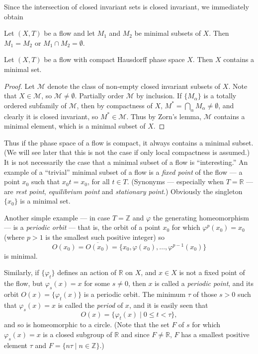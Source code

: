 Since the intersection of closed invariant sets is closed invariant, we immediately obtain


\begin{proposition}
    Let $(X,T)$ be a flow and let $M_1$ and $M_2$ be minimal subsets of $X$. Then $M_1 = M_2$ or $M_1 \cap M_2 = \emptyset$.
\end{proposition}


\begin{theorem}
    Let $(X,T)$ be a flow with compact Hausdorff phase space $X$. Then $X$ contains a minimal set.
\end{theorem}

\begin{proof}
    Let $\mathcal{M}$ denote the class of non-empty closed invariant subsets of $X$. Note that $X \in \mathcal{M}$, so $\mathcal{M} \ne \emptyset$. Partially order $\mathcal{M}$ by inclusion. If $\{M_\alpha\}$ is a totally ordered subfamily of $\mathcal{M}$, then by compactness of $X$, $M^* = \bigcap_\alpha M_\alpha \ne \emptyset$, and clearly it is closed invariant, so $M^* \in \mathcal{M}$. Thus by Zorn’s lemma, $\mathcal{M}$ contains a minimal element, which is a minimal subset of $X$.
\end{proof}


Thus if the phase space of a flow is compact, it always contains a minimal subset. (We will see later that this is not the case if only local compactness is assumed.) It is not necessarily the case that a minimal subset of a flow is “interesting.” An example of a “trivial” minimal subset of a flow is a \emph{fixed point} of the flow — a point $x_0$ such that $x_0 t = x_0$, for all $t \in T$. (Synonyms — especially when $T = \mathbb{R}$ — are \emph{rest point}, \emph{equilibrium point} and \emph{stationary point}.) Obviously the singleton $\{x_0\}$ is a minimal set.

Another simple example — in case $T = \mathbb{Z}$ and $\varphi$ the generating homeomorphism — is a \emph{periodic orbit} — that is, the orbit of a point $x_0$ for which $\varphi^p(x_0) = x_0$ (where $p > 1$ is the smallest such positive integer) so
\[
    O(x_0) = \overline{O(x_0)} = \{x_0, \varphi(x_0), \ldots, \varphi^{p-1}(x_0)\}
\]
is minimal.

Similarly, if $\{\varphi_t\}$ defines an action of $\mathbb{R}$ on $X$, and $x \in X$ is not a fixed point of the flow, but $\varphi_s(x) = x$ for some $s \neq 0$, then $x$ is called a \emph{periodic point}, and its orbit $O(x) = \{\varphi_t(x)\}$ is a periodic orbit. The minimum $\tau$ of those $s > 0$ such that $\varphi_s(x) = x$ is called the \emph{period} of $x$, and it is easily seen that
\[
    O(x) = \{\varphi_t(x) \mid 0 \le t < \tau\},
\]
and so is homeomorphic to a circle. (Note that the set $F$ of $s$ for which $\varphi_s(x) = x$ is a closed subgroup of $\mathbb{R}$ and since $F \ne \mathbb{R}$, $F$ has a smallest positive element $\tau$ and $F = \{n\tau \mid n \in \mathbb{Z}\}$.)





